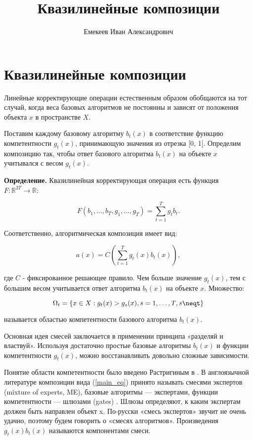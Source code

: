 \documentclass{article}
\title{Квазилинейные композиции}
\author{Емекеев Иван Александрович}
\begin{document}
\maketitle


\section{Квазилинейные композиции}

Линейные корректирующие операции естественным образом обобщаются на тот случай, когда веса базовых алгоритмов не постоянны и зависят от положения объекта $x$ в пространстве $X$.

Поставим каждому базовому алгоритму $b_{t}(x)$ в соответствие функцию компетентности $g_{t}(x)$, принимающую значения из отрезка [0, 1]. Определим композицию так, чтобы ответ базового алгоритма $b_{t}(x)$ на объекте $x$ учитывался с весом $g_{t}(x)$.

\textbf{Определение.} Квазилинейная корректирующая операция есть функция $F: \mathbb{R}^{2T} \rightarrow \mathbb{R}$:

\begin{equation}
    F(b_{1}, \dots, b_{T}, g_{1}, \dots, g_{T}) = \sum_{t=1}^{T}g_{t} b_{t}.
    \label{main_eq}
\end{equation}

Соответственно, алгоритмическая композиция имеет вид:

\begin{equation*}
    a(x) = C(\sum_{t=1}^{T}g_{t}(x)b_{t}(x)),
\end{equation*}

где $C$ - фиксированное решающее правило. Чем больше значение $g_{t}(x)$, тем с большим весом учитывается ответ алгоритма $b_{t}(x)$ на объекте $x$. Множество:

\begin{equation*}
    \Omega_{t} = \{x\in X: g_{t}(x) > g_{s}(x), s = 1, \dots, T, s \neqt\}
\end{equation*}

называется областью компетентности базового алгоритма $b_{t}(x)$.

Основная идея смесей заключается в применении принципа «разделяй и властвуй». Используя достаточно простые базовые алгоритмы $b_{t}(x)$ и функции компетентности $g_{t}(x)$, можно восстанавливать довольно сложные зависимости.

Понятие области компетентности было введено Растригиным в \cite{растригин1981коллективные}. В англоязычной литературе композиции вида (\ref{main_eq}) принято называть смесями экспертов
(mixture of experts, ME), базовые алгоритмы — экспертами, функции компетентности — шлюзами (gates) \cite{jacobs1991adaptive}. Шлюзы определяют, к каким экспертам должен быть
направлен объект x. По-русски «смесь экспертов» звучит не очень удачно, поэтому
будем говорить о «смесях алгоритмов». Произведения $g_{t}(x)b_{t}(x)$ называются компонентами смеси.
\end{document}
